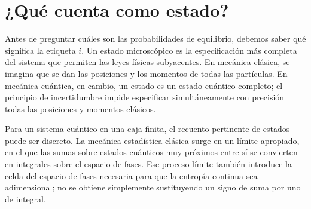 \begin{classroomqa}
\end{classroomqa}

\section{¿Qué cuenta como estado?}

Antes de preguntar cuáles son las probabilidades de equilibrio, debemos saber qué significa la etiqueta \(i\). Un estado microscópico es la especificación más completa del sistema que permiten las leyes físicas subyacentes. En mecánica clásica, se imagina que se dan las posiciones y los momentos de todas las partículas. En mecánica cuántica, en cambio, un estado es un estado cuántico completo; el principio de incertidumbre impide especificar simultáneamente con precisión todas las posiciones y momentos clásicos.

Para un sistema cuántico en una caja finita, el recuento pertinente de estados puede ser discreto. La mecánica estadística clásica surge en un límite apropiado, en el que las sumas sobre estados cuánticos muy próximos entre sí se convierten en integrales sobre el espacio de fases. Ese proceso límite también introduce la celda del espacio de fases necesaria para que la entropía continua sea adimensional; no se obtiene simplemente sustituyendo un signo de suma por uno de integral.

\begin{classroomqa}
\end{classroomqa}

